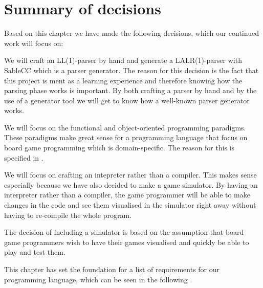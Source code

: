 \section{Summary of decisions}
\label{sec:summaryofdecisions}

Based on this chapter we have made the following decisions, which our
continued work will focus on:

We will craft an LL(1)-parser by hand and generate a LALR(1)-parser with SableCC
which is a parser generator. The reason for this decision is the fact that this
project is ment as a learning experience and therefore knowing how the parsing
phase works is important. By both crafting a parser by hand and by the use of a
generator tool we will get to know how a well-known parser generator works.

We will focus on the functional and object-oriented programming
paradigms. These paradigms make great sense for a programming language that
focus on board game programming which is domain-specific. The reason for this 
is specified in .

We will focus on crafting an intepreter rather than a compiler. This
makes sense especially because we have also decided to make a game simulator.
By having an interpreter rather than a compiler, the game programmer will be
able to make changes in the code and see them visualised in the simulator right
away without having to re-compile the whole program.

The decision of including a simulator is based on the assumption that board game
programmers wish to have their games visualised and quickly be able to play and
test them.

This chapter has set the foundation for a list of requirements for
our programming language, which can be seen in the following
.
